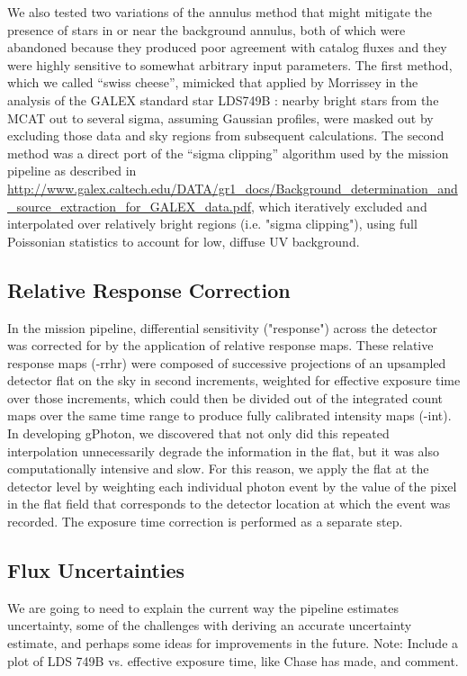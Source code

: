 \documentclass[5p]{elsarticle}
\begin{document}
We also tested two variations of the annulus method that might mitigate the presence of stars in or near the background annulus, both of which were abandoned because they produced poor agreement with catalog fluxes and they were highly sensitive to somewhat arbitrary input parameters. The first method, which we called ``swiss cheese'', mimicked that applied by Morrissey in the analysis of the GALEX standard star LDS749B \citet{mor2007}: nearby bright stars from the MCAT out to several sigma, assuming Gaussian profiles, were masked out by excluding those data and sky regions from subsequent calculations. The second method was a direct port of the ``sigma clipping'' algorithm used by the mission pipeline as described in \url{http://www.galex.caltech.edu/DATA/gr1_docs/Background_determination_and_source_extraction_for_GALEX_data.pdf}, which iteratively excluded and interpolated over relatively bright regions (i.e. "sigma clipping"), using full Poissonian statistics to account for low, diffuse UV background.

\subsection{Relative Response Correction}
In the mission pipeline, differential sensitivity ("response") across the detector was corrected for by the application of relative response maps. These relative response maps (-rrhr) were composed of successive projections of an upsampled detector flat on the sky in second increments, weighted for effective exposure time over those increments, which could then be divided out of the integrated count maps over the same time range to produce fully calibrated intensity maps (-int). In developing gPhoton, we discovered that not only did this repeated interpolation unnecessarily degrade the information in the flat, but it was also computationally intensive and slow. For this reason, we apply the flat at the detector level by weighting each individual photon event by the value of the pixel in the flat field that corresponds to the detector location at which the event was recorded. The exposure time correction is performed as a separate step.

\subsection{Flux Uncertainties}
{\color{red}We are going to need to explain the current way the pipeline estimates uncertainty, some of the challenges with deriving an accurate uncertainty estimate, and perhaps some ideas for improvements in the future.}
{\color{red}Note: Include a plot of LDS 749B vs. effective exposure time, like Chase has made, and comment.}
\end{document}
